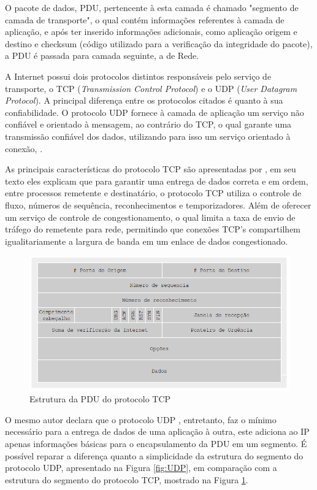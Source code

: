 O pacote de dados, PDU, pertencente à esta camada é chamado "segmento de camada de transporte", o qual contém informações referentes à camada de aplicação, e após ter inserido informaç\~oes adicionais, como aplicaç\~ao origem e destino e checksum (c\'odigo utilizado para a verificaç\~ao da integridade do pacote), a PDU é passada para camada seguinte, a de Rede.

A Internet possui dois protocolos distintos responsáveis pelo serviço de transporte, o TCP (\textit{Transmission Control Protocol}) e o UDP (\textit{User Datagram Protocol}). A principal diferença entre os protocolos citados é quanto à sua confiabilidade. O protocolo UDP fornece à camada de aplicação um serviço não confiável e orientado à mensagem, ao contrário do TCP, o qual garante uma transmissão confiável dos dados, utilizando para isso um serviço orientado à conexão, \cite{COMER}.

As principais características do protocolo TCP são apresentadas por , em seu texto eles explicam que para garantir uma entrega de dados correta e em ordem, entre processos remetente e destinatário, o protocolo TCP utiliza o controle de fluxo, números de sequência, reconhecimentos e temporizadores. Além de oferecer um serviço de controle de congestionamento, o qual limita a taxa de envio de tráfego do remetente para rede, permitindo que conexões TCP's compartilhem igualitariamente a largura de banda em um enlace de dados congestionado.

\begin{figure}[H]
	\centering
    \includegraphics[width=\textwidth]{04-figuras/TCP.png}
    \caption{Estrutura da PDU do protocolo TCP}
    \label{fig:TCP}
\end{figure}

O mesmo autor declara que o protocolo UDP \cite{RFC768}, entretanto, faz o mínimo necessário para a entrega de dados de uma aplicação à outra, este adiciona ao IP apenas informações básicas para o encapsulamento da PDU em um segmento. É possível reparar a diferença quanto a simplicidade da estrutura do segmento do protocolo UDP, apresentado na Figura \ref{fig:UDP}, em comparação com a estrutura do segmento do protocolo TCP, mostrado na Figura \ref{fig:TCP}.


